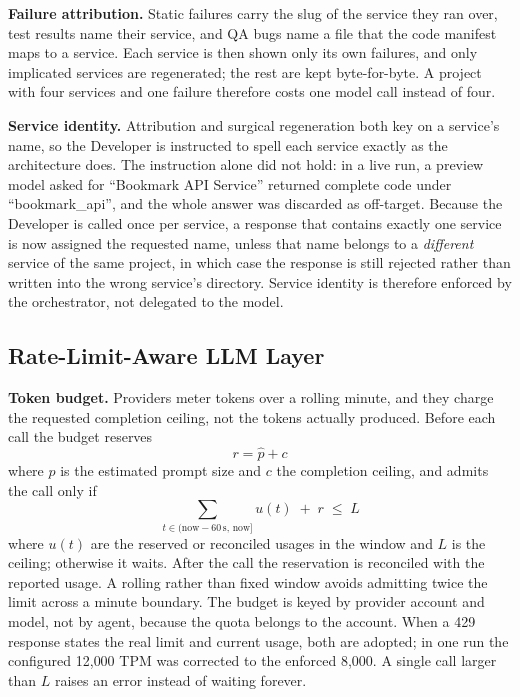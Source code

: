 \documentclass[conference,letterpaper]{IEEEtran}
\begin{document}
\textbf{Failure attribution.} Static failures carry the slug of the service they
ran over, test results name their service, and QA bugs name a file that the code
manifest maps to a service. Each service is then shown only its own failures,
and only implicated services are regenerated; the rest are kept byte-for-byte.
A project with four services and one failure therefore costs one model call
instead of four.

\textbf{Service identity.} Attribution and surgical regeneration both key on a
service's name, so the Developer is instructed to spell each service exactly as
the architecture does. The instruction alone did not hold: in a live run, a
preview model asked for ``Bookmark API Service'' returned complete code under
``bookmark\_api'', and the whole answer was discarded as off-target. Because the
Developer is called once per service, a response that contains exactly one
service is now assigned the requested name, unless that name belongs to a
\emph{different} service of the same project, in which case the response is
still rejected rather than written into the wrong service's directory. Service
identity is therefore enforced by the orchestrator, not delegated to the model.

\subsection{Rate-Limit-Aware LLM Layer}
\textbf{Token budget.} Providers meter tokens over a rolling minute, and they
charge the requested completion ceiling, not the tokens actually produced.
Before each call the budget reserves
\begin{equation}
r=\hat{p}+c
\label{eq:reserve}
\end{equation}
where $\hat{p}$ is the estimated prompt size and $c$ the completion ceiling, and
admits the call only if
\begin{equation}
\sum_{t\in(\text{now}-60\,\text{s},\,\text{now}]} u(t)\;+\;r\;\le\;L
\label{eq:window}
\end{equation}
where $u(t)$ are the reserved or reconciled usages in the window and $L$ is the
ceiling; otherwise it waits. After the call the reservation is reconciled with
the reported usage. A rolling rather than fixed window avoids admitting twice
the limit across a minute boundary. The budget is keyed by provider account and
model, not by agent, because the quota belongs to the account. When a 429
response states the real limit and current usage, both are adopted; in one run
the configured 12{,}000 TPM was corrected to the enforced 8{,}000. A single call
larger than $L$ raises an error instead of waiting forever.
\end{document}
